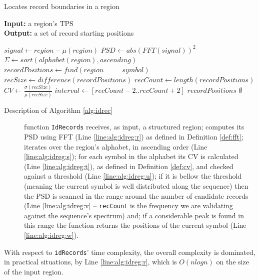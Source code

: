 \documentclass{vldb}
\begin{document}
\begin{algorithm}
\caption{Locates record boundaries in a region}
\label{alg:idrec}
\textbf{Input:} a region's TPS \\
\textbf{Output:} a set of record starting positions

\begin{algorithmic}[1]

\State $signal \leftarrow region-\mu(region)$ 
\State $PSD \leftarrow abs(FFT(signal))^2$\label{line:alg:idreg:r}
\State $\Sigma \leftarrow sort(alphabet(region), ascending)$
\label{line:alg:idreg:s}
\State $recordPositions \leftarrow find(region == symbol)$
\State $recSize \leftarrow difference(recordPositions)$
\State $recCount \leftarrow length(recordPositions)$
\State $CV \leftarrow
\frac{\sigma(recSize)}{\mu(recSize)}$\label{line:alg:idreg:t}
\label{line:alg:idreg:u}
\State $interval \leftarrow [recCount-2 .. recCount+2]$
\label{line:alg:idreg:v}
\State \Return $recordPositions$\label{line:alg:idreg:w}
\EndIf
\EndIf
\EndFor
\State \Return $\emptyset$
\EndFunction

\end{algorithmic}
\end{algorithm}

\begin{description}
\item[Description of Algorithm \ref{alg:idrec}] function \texttt{IdRecords}
receives, as input, a structured region; computes its PSD using FFT (Line
\ref{line:alg:idreg:r}) as defined in Definition \ref{def:fft}; iterates over
the region's alphabet, in ascending order (Line \ref{line:alg:idreg:s}); for
each symbol in the alphabet its CV is calculated (Line \ref{line:alg:idreg:t}),
as defined in Definition \ref{def:cv}, and checked against a threshold (Line
\ref{line:alg:idreg:u}); if it is bellow the threshold (meaning the
current symbol is well distributed along the sequence) then the PSD is scanned
in the range around the number of candidate records (Line \ref{line:alg:idreg:v}
-- \texttt{recCount} is the frequency we are validating against the sequence's
spectrum) and; if a considerable peak is found in this range the function returns the
positions of the current symbol (Line \ref{line:alg:idreg:w}).
\end{description}

With respect to \texttt{idRecords}' time complexity, the overall complexity is
dominated, in practical situations, by Line \ref{line:alg:idreg:r}, which is
$O(nlogn)$ on the size of the input region. 
\end{document}
